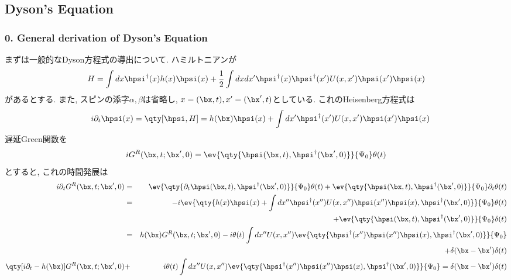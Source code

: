 \documentclass[10.5pt,a4paper]{jreport}
\begin{document}
\subsection{Dyson's Equation}
\subsubsection{0. General derivation of Dyson's Equation}
まずは一般的なDyson方程式の導出について. ハミルトニアンが
\begin{eqnarray}
  H = \int dx\hpsi^\dagger(x) h(x)\hpsi(x) + \frac{1}{2}\int dxdx'\hpsi^\dagger(x)\hpsi^\dagger(x')U(x, x')\hpsi(x')\hpsi(x)
\end{eqnarray}
があるとする. また, スピンの添字$\alpha, \beta$は省略し, $x = (\bx, t), x' = (\bx', t)$としている. これのHeisenberg方程式は
\begin{eqnarray}
  && i\partial_t\hpsi(x) = \qty[\hpsi, H] = h(\bx)\hpsi(x) + \int dx'\hpsi^\dagger(x')U(x, x')\hpsi(x')\hpsi(x)\\
\end{eqnarray}
遅延Green関数を
\begin{eqnarray}
  iG^R(\bx, t; \bx', 0) = \ev{\qty{\hpsi(\bx, t), \hpsi^\dagger(\bx', 0)}}{\Psi_0}\theta(t)
\end{eqnarray}
とすると, これの時間発展は
\begin{eqnarray}
  \nonumber  i\partial_tG^R(\bx, t; \bx', 0) &=& \ev{\qty{\partial_t\hpsi(\bx, t), \hpsi^\dagger(\bx', 0)}}{\Psi_0}\theta(t) + \ev{\qty{\hpsi(\bx, t), \hpsi^\dagger(\bx', 0)}}{\Psi_0}\partial_t\theta(t)\\
  \nonumber  &=& -i\ev{\qty{h(x)\hpsi(x) + \int dx''\hpsi^\dagger(x'')U(x, x'')\hpsi(x'')\hpsi(x), \hpsi^\dagger(\bx', 0)}}{\Psi_0}\theta(t)\\
  \nonumber&& + \ev{\qty{\hpsi(\bx, t), \hpsi^\dagger(\bx', 0)}}{\Psi_0}\delta(t)\\
  \nonumber  &=&h(\bx)G^R(\bx, t; \bx', 0) -i\theta(t)\int dx''U(x, x'')\ev{\qty{\hpsi^\dagger(x'')\hpsi(x'')\hpsi(x), \hpsi^\dagger(\bx', 0)}}{\Psi_0}\\
  \nonumber&& +\delta(\bx-\bx')\delta(t)\\
  \nonumber\qty[i\partial_t -h(\bx)]G^R(\bx, t; \bx', 0) &+&i\theta(t)\int dx''U(x, x'')\ev{\qty{\hpsi^\dagger(x'')\hpsi(x'')\hpsi(x), \hpsi^\dagger(\bx', 0)}}{\Psi_0}  = \delta(\bx-\bx')\delta(t)\\
\end{eqnarray}
\end{document}
